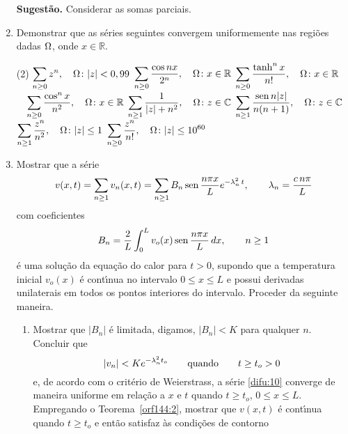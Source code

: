 \begin{enumerate}[label=\rm{(\arabic*)}]
\textbf{Sugest\~{a}o.} Considerar as somas parciais. 
\item Demonstrar
que as s\'{e}ries seguintes convergem uniformemente nas regi\~{o}es dadas $\Omega$, onde $x \in \mathbb{R}$.
\begin{tasks}[label=\rm{(\alph*)},item-indent=3em,label-width=4ex,ref=\rm{(\alph*)}](2)
\task  \(\displaystyle{\sum_{n\geq 0}z^n},\quad \Omega\colon |z|<0,99\)
\task  \(\displaystyle{\sum_{n\geq 0}\dfrac{\cos nx}{2^n}},\quad  \Omega\colon x\in \mathbb{R}\)
\task  \(\displaystyle{\sum_{n\geq 0}\dfrac{\tanh^n x}{n!}}, \quad \Omega\colon x\in \mathbb{R}\)
\task  \(\quad\displaystyle{\sum_{n\geq 0}\frac{\cos^n x}{n^2}},\quad \Omega\colon x\in \mathbb{R}\)
\task  \(\displaystyle{\sum_{n\geq 1}\dfrac{1}{|z|+n^2}},\quad \Omega\colon z\in \mathbb{C}\)
\task  \(\displaystyle{\sum_{n\geq 1}\dfrac{\operatorname{sen}n|z|}{n(n+1)}},\quad \Omega\colon z\in \mathbb{C}\)
\task  \(\displaystyle{\sum_{n\geq 1}\dfrac{z^n}{n^2}},\quad  \Omega\colon |z|\le 1 \)
\task  \(\displaystyle{\sum_{n\geq 0}\dfrac{z^n}{n!}},\quad  \Omega\colon |z|\le 10^{60}\)
\end{tasks}
\item Mostrar que a s\'{e}rie
\begin{equation}\label{difu:10}
v(x,t)=\sum_{n\geq 1}v_n(x,t)=\sum_{n\geq 1}B_n\operatorname{sen} \frac{n\pi
x}{L}e^{-\lambda_n^2\,t},\qquad \lambda_n=\frac{c\,n\pi}{L}
\end{equation}
com coeficientes
\begin{equation}\label{difu:11}
B_n=\frac{2}{L}\int_0^Lv_o(x)\operatorname{sen} \frac{n\pi x}{L}\,dx,\qquad
n\geq 1
\end{equation}
\'{e} uma solu\c{c}\~{a}o da equa\c{c}\~{a}o do calor para $t > 0$, supondo que a
temperatura inicial $v_o(x)$ \'{e} cont\'{\i}nua no intervalo $0\le x \le
L$ e possui derivadas unilaterais em todos os pontos interiores do
intervalo. Proceder da seguinte maneira.
\begin{enumerate}[label=(\alph*)]
\item Mostrar que $|B_n|$ \'{e} limitada, digamos, $| B_n| < K$ para
qualquer $n$. Concluir que
\begin{equation*}
|v_n| < Ke^{-\lambda_n^2 t_o}\qquad \text{quando}\qquad  t \geq t_o> 0
\end{equation*}
e, de acordo com o crit\'{e}rio de Weierstrass, a s\'{e}rie
\eqref{difu:10} converge de maneira uniforme em rela\c{c}\~{a}o a $x$ e
$t$ quando $t\geq t_o$, $0\le x \le L$. Empregando o
Teorema~\ref{orf144:2}, mostrar que $v(x, t)$ \'{e} cont\'{\i}nua quando $t
\geq t_o$ e ent\~{a}o satisfaz \`{a}s condi\c{c}\~{o}es de contorno
\begin{equation}\label{difu:2}

\end{equation}
\end{enumerate}
\end{enumerate}
